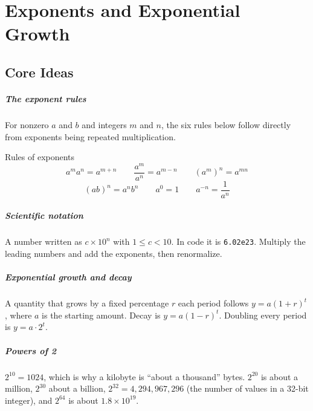 \chapter{Exponents and Exponential Growth}


\section{Core Ideas}

\paragraph{The exponent rules} For nonzero $a$ and $b$ and integers $m$ and $n$, the six rules below follow directly from exponents being repeated multiplication.

\begin{keybox}{Rules of exponents}
\[
a^m a^n = a^{m+n} \qquad \frac{a^m}{a^n} = a^{m-n} \qquad (a^m)^n = a^{mn}
\]
\[
(ab)^n = a^n b^n \qquad a^0 = 1 \qquad a^{-n} = \frac{1}{a^n}
\]
\end{keybox}

\paragraph{Scientific notation} A number written as $c \times 10^n$ with $1 \le c < 10$. In code it is \lstinline!6.02e23!. Multiply the leading numbers and add the exponents, then renormalize.

\paragraph{Exponential growth and decay} A quantity that grows by a fixed percentage $r$ each period follows $y = a(1 + r)^t$, where $a$ is the starting amount. Decay is $y = a(1 - r)^t$. Doubling every period is $y = a \cdot 2^t$.

\paragraph{Powers of 2} $2^{10} = 1024$, which is why a kilobyte is ``about a thousand'' bytes. $2^{20}$ is about a million, $2^{30}$ about a billion, $2^{32} = 4{,}294{,}967{,}296$ (the number of values in a 32-bit integer), and $2^{64}$ is about $1.8 \times 10^{19}$.

